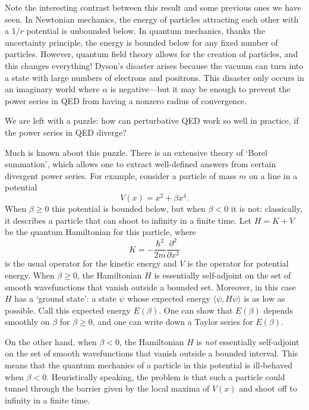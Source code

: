 \documentclass{article}
\begin{document}
Note the interesting contrast between this result and some previous ones we have seen.  In Newtonian mechanics, the energy of particles attracting each other with a $1/r$ potential is unbounded below.   In quantum mechanics, thanks the uncertainty principle, the energy is bounded below for any fixed number of particles.  However, quantum field theory allows for the creation of particles, and this changes everything!   Dyson's disaster arises because the vacuum can turn into a state with large numbers of electrons and positrons.  This disaster only occurs in an imaginary world where $\alpha$ is negative---but it may be enough to prevent the power series in QED from having a nonzero radius of convergence.  

We are left with a puzzle: how can perturbative QED work so well in practice, if the power series in QED diverge?

Much is known about this puzzle.   There is an extensive theory of `Borel summation', which allows one to extract well-defined answers from certain divergent power series. For example, consider a particle of mass $m$ on a line in a potential
\[    V(x) = x^2 + \beta x^4  .\]
When $\beta \ge 0$ this potential is bounded below, but when $\beta < 0$ it is not: classically, it describes a particle that can shoot to infinity in a finite time.   Let $H = K + V$ be the quantum Hamiltonian for this particle, where
\[  K = -\displaystyle{\frac{\hbar^2}{2m} \frac{\partial^2}{\partial x^2} } \]
is the usual operator for the kinetic energy and $V$ is the operator for potential energy.  When $\beta \ge 0$, the Hamiltonian $H$ is essentially self-adjoint on the set of smooth wavefunctions that vanish outside a bounded set.  Moreover, in this case $H$ has a `ground state': a state $\psi$ whose expected energy $\langle \psi, H \psi \rangle$ is as low as possible.   Call this expected energy $E(\beta)$.  One can show that $E(\beta)$ depends smoothly on $\beta$ for $\beta \ge 0$, and one can write down a Taylor series for $E(\beta)$.  

On the other hand, when $\beta < 0$, the Hamiltonian $H$ is \emph{not} essentially self-adjoint on the set of smooth wavefunctions that vanish outside a bounded interval.  This means that the quantum mechanics of a particle in this potential is ill-behaved when $\beta < 0$.  Heuristically speaking, the problem is that such a particle could tunnel through the barrier given by the local maxima of $V(x)$ and shoot off to infinity in a finite time.
\end{document}
